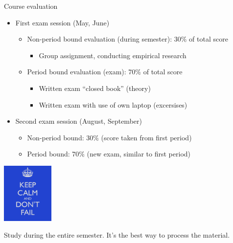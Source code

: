 \documentclass{beamer}
\begin{document}
\begin{frame}{Course evaluation}

  \begin{itemize}
    \item First exam session (May, June)
      \begin{itemize}
        \item Non-period bound evaluation (during semester): 30\% of total score
          \begin{itemize}
            \item Group assignment, conducting empirical research
          \end{itemize}
        \item Period bound evaluation (exam): 70\% of total score
          \begin{itemize}
            \item Written exam ``closed book'' (theory)
            \item Written exam with use of own laptop (excersises)
          \end{itemize}
      \end{itemize}
    \item Second exam session (August, September)
      \begin{itemize}
        \item Non-period bound: 30\% (score taken from first period)
        \item Period bound: 70\% (new exam, similar to first period)
      \end{itemize}
    \end{itemize}

  \begin{center}
    \includegraphics[height=3cm]{img/intro-07}
  \end{center}
Study during the entire semester. It's the best way to process the material.
\end{frame}
\end{document}
